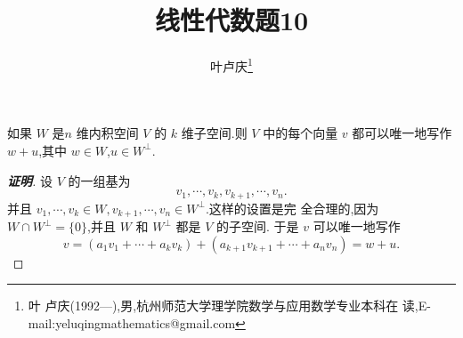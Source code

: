 ﻿\documentclass[a4paper]{article}
\begin{document}
\title{\huge{\bf{线性代数题10}}} \author{\small{叶卢庆\footnote{叶
      卢庆(1992---),男,杭州师范大学理学院数学与应用数学专业本科在
      读,E-mail:yeluqingmathematics@gmail.com}}}
\maketitle\ni
\begin{exercise}
 如果 $W$ 是$n$ 维内积空间 $V$ 的 $k$ 维子空间.则 $V$ 中的每个向量 $v$
 都可以唯一地写作 $w+u$,其中 $w\in W$,$u\in W^{\bot}$.
\end{exercise}
\begin{proof}[\textbf{证明}]
设 $V$ 的一组基为
$$
v_1,\cdots,v_k,v_{k+1},\cdots,v_n.
$$
并且 $v_1,\cdots,v_k\in W,v_{k+1},\cdots,v_n\in W^{\bot}$.这样的设置是完
全合理的,因为 $W\cap W^{\bot}=\{0\}$,并且 $W$ 和 $W^{\bot}$ 都是 $V$
的子空间. 于是 $v$ 可以唯一地写作
$$
v=(a_1v_1+\cdots+a_kv_k)+(a_{k+1}v_{k+1}+\cdots+a_nv_n)=w+u.
$$
  
\end{proof}
\end{document}
